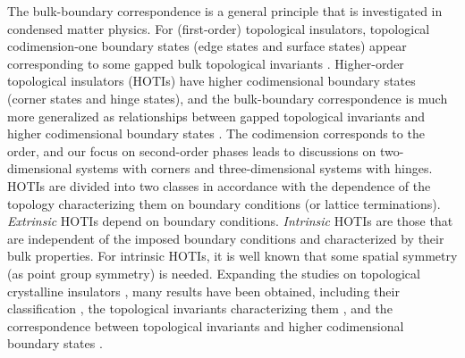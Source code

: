 \documentclass{amsart}
\theoremstyle{plain}
\theoremstyle{definition}
\theoremstyle{remark}
\begin{document}
The bulk-boundary correspondence is a general principle that is investigated in condensed matter physics.
For (first-order) topological insulators, topological codimension-one boundary states (edge states and surface states) appear corresponding to some gapped bulk topological invariants \cite{Hat93b,KRSB02,GP13,PSB16}.
Higher-order topological insulators (HOTIs) have higher codimensional boundary states (corner states and hinge states), and the bulk-boundary correspondence is much more generalized as relationships between gapped topological invariants and higher codimensional boundary states \cite{BBH17a,Khalaf18a,Schindler18}.
The codimension corresponds to the order, and our focus on second-order phases leads to discussions on two-dimensional systems with corners and three-dimensional systems with hinges.
HOTIs are divided into two classes \cite{Geier18} in accordance with the dependence of the topology characterizing them on boundary conditions (or lattice terminations).
{\em Extrinsic} HOTIs depend on boundary conditions.
{\em Intrinsic} HOTIs are those that are independent of the imposed boundary conditions and characterized by their bulk properties.
For intrinsic HOTIs, it is well known that some spatial symmetry (as point group symmetry) is needed.
Expanding the studies on topological crystalline insulators \cite{FK07,HPB11,SS14}, many results have been obtained, including their classification \cite{Geier18,Khalaf18b}, the topological invariants characterizing them \cite{BBH17a,Khalaf18a,KSS20}, and the correspondence between topological invariants and higher codimensional boundary states \cite{LB19,TTM20a,TTM20b}.
\end{document}
